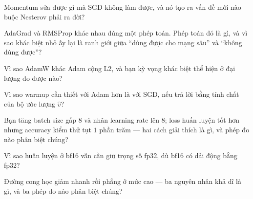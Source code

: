 \documentclass[../../../deep_learning.tex]{subfiles}
\begin{document}
\begin{tukiem}
\item Momentum sửa được gì mà SGD không làm được, và nó tạo ra vấn đề mới nào buộc Nesterov phải ra đời?
\item AdaGrad và RMSProp khác nhau đúng một phép toán. Phép toán đó là gì, và vì sao khác biệt nhỏ ấy lại là ranh giới giữa ``dùng được cho mạng sâu'' và ``không dùng được''?
\item Vì sao AdamW khác Adam cộng L2, và bạn kỳ vọng khác biệt thể hiện ở đại lượng đo được nào?
\item Vì sao warmup cần thiết với Adam hơn là với SGD, nếu trả lời bằng tính chất của bộ ước lượng \(\hat v\)?
\item Bạn tăng batch size gấp \(8\) và nhân learning rate lên \(8\); loss huấn luyện tốt hơn nhưng accuracy kiểm thử tụt \(1\) phần trăm --- hai cách giải thích là gì, và phép đo nào phân biệt chúng?
\item Vì sao huấn luyện ở bf16 vẫn cần giữ trọng số fp32, dù bf16 có dải động bằng fp32?
\item Đường cong học giảm nhanh rồi phẳng ở mức cao --- ba nguyên nhân khả dĩ là gì, và ba phép đo nào phân biệt chúng?
\end{tukiem}
\ifSubfilesClassLoaded{\printbibliography[title={Nguồn}]}{}
\end{document}
